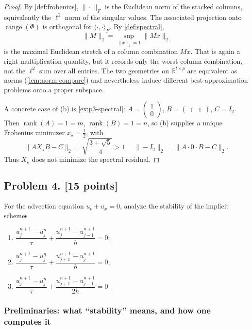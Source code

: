 \documentclass[11pt,a4paper]{article}
\DeclareMathOperator{\rank}{rank}
\begin{document}
\begin{proof}
By \cref{def:frobenius}, \(\|\cdot\|_{F}\) is the Euclidean norm of the stacked columns, equivalently the \(\ell^{2}\) norm of the singular values. The associated projection onto \(\operatorname{range}(\Phi)\) is orthogonal for \(\langle\cdot,\cdot\rangle_{F}\). By \cref{def:spectral},
\[
\|M\|_{2}
=
\sup_{\|x\|_{2}=1}\|Mx\|_{2}
\]
is the maximal Euclidean stretch of a column combination \(Mx\). That is again a right-multiplication quantity, but it records only the worst column combination, not the \(\ell^{2}\) sum over all entries. The two geometries on \(\mathbb{R}^{l\times p}\) are equivalent as norms (\cref{lem:norm-compare}) and nevertheless induce different best-approximation problems onto a proper subspace.

A concrete case of (b) is \cref{ex:p3-spectral}: \(A=\begin{pmatrix}1\\0\end{pmatrix}\), \(B=\begin{pmatrix}1&1\end{pmatrix}\), \(C=I_{2}\). Then \(\rank(A)=1=m\), \(\rank(B)=1=n\), so (b) supplies a unique Frobenius minimizer \(x_{\star}=\tfrac12\), with
\[
\|AX_{\star}B-C\|_{2}
=
\sqrt{\frac{3+\sqrt{5}}{4}}
>
1
=
\|-I_{2}\|_{2}
=
\|A\cdot 0\cdot B-C\|_{2}.
\]
Thus \(X_{\star}\) does not minimize the spectral residual.
\end{proof}

\subsection{Problem 4. [15 points]}
For the advection equation \(u_{t} + u_{x} = 0\), analyze the stability of the implicit schemes
\begin{enumerate}[label=(\alph*)]
    \item \(\dfrac{u_{j}^{n+1} - u_{j}^{n}}{\tau} + \dfrac{u_{j}^{n+1} - u_{j-1}^{n+1}}{h} = 0\);
    \item \(\dfrac{u_{j}^{n+1} - u_{j}^{n}}{\tau} + \dfrac{u_{j+1}^{n+1} - u_{j}^{n+1}}{h} = 0\);
    \item \(\dfrac{u_{j}^{n+1} - u_{j}^{n}}{\tau} + \dfrac{u_{j+1}^{n+1} - u_{j-1}^{n+1}}{2h} = 0\).
\end{enumerate}

\setcounter{section}{4}
\setcounter{theorem}{0}
\setcounter{definition}{0}
\setcounter{remark}{0}
\setcounter{note}{0}

\subsubsection{Preliminaries: what ``stability'' means, and how one computes it}
\end{document}
